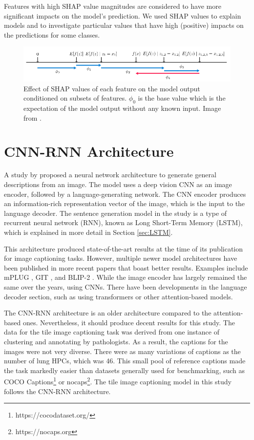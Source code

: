 \documentclass{l4proj}
\begin{document}
Features with high SHAP value magnitudes are considered to have more significant impacts on the model's prediction. We used SHAP values to explain models and to investigate particular values that have high (positive) impacts on the predictions for some classes.

\begin{figure}
    \centering
    \includegraphics[width=1\linewidth]{images/shap.png}
    \caption{Effect of SHAP values of each feature on the model output conditioned on subsets of features. $\phi_0$ is the base value which is the expectation of the model output without any known input. Image from \cite{lundberg2017}.}
    \label{fig:shap}
\end{figure}

\section{CNN-RNN Architecture}
A study by \cite{Vinyals2015} proposed a neural network architecture to generate general descriptions from an image. The model uses a deep vision CNN as an image encoder, followed by a language-generating network. The CNN encoder produces an information-rich representation vector of the image, which is the input to the language decoder. The sentence generation model in the study is a type of recurrent neural network (RNN), known as Long Short-Term Memory (LSTM), which is explained in more detail in Section \ref{sec:LSTM}.

This architecture produced state-of-the-art results at the time of its publication for image captioning tasks. However, multiple newer model architectures have been published in more recent papers that boast better results. Examples include mPLUG \citep{mplug}, GIT \citep{GIT}, and BLIP-2 \citep{blip2}. While the image encoder has largely remained the same over the years, using CNNs. There have been developments in the language decoder section, such as using transformers or other attention-based models. 

The CNN-RNN architecture is an older architecture compared to the attention-based ones. Nevertheless, it should produce decent results for this study. The data for the tile image captioning task was derived from one instance of clustering and annotating by pathologists. As a result, the captions for the images were not very diverse. There were as many variations of captions as the number of lung HPCs, which was 46. This small pool of reference captions made the task markedly easier than datasets generally used for benchmarking, such as COCO Captions\footnote{https://cocodataset.org/} or nocaps\footnote{https://nocaps.org}. The tile image captioning model in this study follows the CNN-RNN architecture.
\end{document}
